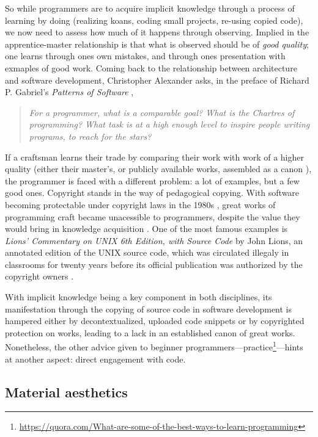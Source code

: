 So while programmers are to acquire implicit knowledge through a process of learning by doing (realizing koans, coding small projects, re-using copied code), we now need to assess how much of it happens through observing. Implied in the apprentice-master relationship is that what is observed should be of \textit{good quality}; one learns through ones own mistakes, and through ones presentation with exmaples of good work. Coming back to the relationship between architecture and software development, Christopher Alexander asks, in the preface of Richard P. Gabriel's \textit{Patterns of Software} \citep{gabriel_patterns_1998},

\begin{quote}
  \textit{For a programmer, what is a comparable goal? What is the Chartres of programming? What task is at a high enough level to inspire people writing programs, to reach for the stars?}
\end{quote}

If a craftsman learns their trade by comparing their work with work of a higher quality (either their master's, or publicly available works, assembled as a canon \citep{taylor_patterns_2001}), the programmer is faced with a different problem: a lot of examples, but a few good ones.  Copyright stands in the way of pedagogical copying. With software becoming protectable under copyright laws in the 1980s \citep{oman_computer_2018}, great works of programming craft became unacessible to programmers, despite the value they would bring in knowledge acquisition \citep{gabriel_mob_2001}. One of the most famous examples is \emph{Lions' Commentary on UNIX 6th Edition, with Source Code} by John Lions, an annotated edition of the UNIX source code, which was circulated illegaly in classrooms for twenty years before its official publication was authorized by the copyright owners \citep{lions_lions_1996}.

With implicit knowledge being a key component in both disciplines, its manifestation through the copying of source code in software development is hampered either by decontextualized, uploaded code snippets or by copyrighted protection on works, leading to a lack in an established canon of great works. Nonetheless, the other advice given to beginner programmers—practice\footnote{\url{https://quora.com/What-are-some-of-the-best-ways-to-learn-programming}}—hints at another aspect: direct engagement with code.

\subsection{Material aesthetics}

